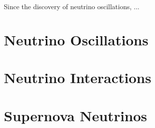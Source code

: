 Since the discovery of neutrino oscillations, ...



\section{Neutrino Oscillations} \label{nu_osc}

\section{Neutrino Interactions} \label{nu_prod}

\section{Supernova Neutrinos} \label{nu_sn}

